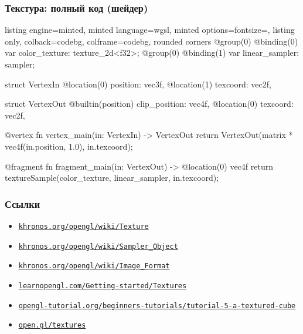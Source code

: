 \documentclass[10pt]{beamer}
\begin{document}
\begin{frame}[fragile]
\frametitle{Текстура: полный код (шейдер)}
\begin{tcblisting}{listing engine=minted, minted language=wgsl, minted options={fontsize=\scriptsize}, listing only, colback=codebg, colframe=codebg, rounded corners}
@group(0) @binding(0) var color_texture: texture_2d<f32>;
@group(0) @binding(1) var linear_sampler: sampler;

struct VertexIn {
  @location(0) position: vec3f,
  @location(1) texcoord: vec2f,
}

struct VertexOut {
  @builtin(position) clip_position: vec4f,
  @location(0) texcoord: vec2f,
}

@vertex
fn vertex_main(in: VertexIn) -> VertexOut {
  return VertexOut(matrix * vec4f(in.position, 1.0), in.texcoord);
}

@fragment
fn fragment_main(in: VertexOut) -> @location(0) vec4f {
  return textureSample(color_texture, linear_sampler, in.texcoord);
}
\end{tcblisting}
\end{frame}

\begin{frame}[fragile]
\frametitle{Ссылки}
\begin{itemize}
\item \href{https://www.khronos.org/opengl/wiki/Texture}{\nolinkurl{khronos.org/opengl/wiki/Texture}}
\item \href{https://www.khronos.org/opengl/wiki/Sampler_Object}{\nolinkurl{khronos.org/opengl/wiki/Sampler\_Object}}
\item \href{https://www.khronos.org/opengl/wiki/Image_Format}{\nolinkurl{khronos.org/opengl/wiki/Image\_Format}}
\item \href{https://learnopengl.com/Getting-started/Textures}{\nolinkurl{learnopengl.com/Getting-started/Textures}}
\item \href{http://www.opengl-tutorial.org/beginners-tutorials/tutorial-5-a-textured-cube}{\nolinkurl{opengl-tutorial.org/beginners-tutorials/tutorial-5-a-textured-cube}}
\item \href{https://open.gl/textures}{\nolinkurl{open.gl/textures}}
\end{itemize}
\end{frame}
\end{document}
